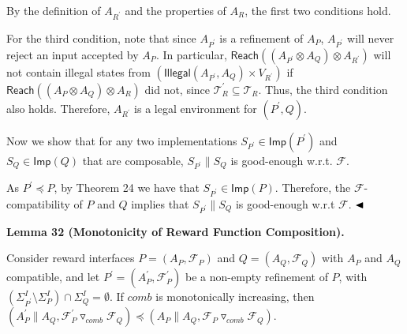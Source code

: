  
  
By the definition of $A_{R^{\prime}}$ and the properties of $A_{R}$, the first two conditions hold.\par
 
 
 
For the third condition, note that since $A_{P^{\prime}}$ is a refinement of $A_{P}$, $A_{P^{\prime}}$ will never reject an input accepted by $A_{P}$. In particular, $\mathsf{Reach}((A_{P^{\prime}}\otimes A_{Q})\otimes A_{R^{\prime}})$ will not contain illegal states from $(\mathsf{Illegal}(A_{P^{\prime}},A_{Q})\times V_{R^{\prime}})$ if $\mathsf{Reach}((A_{P}\otimes A_{Q})\otimes A_{R})$ did not, since $\mathcal{T}^{\prime}_{R}\subseteq\mathcal{T}_{R}$. Thus, the third condition also holds. Therefore, $A_{R^{\prime}}$ is a legal environment for $(P^{\prime},Q)$.\par
 
 
 
Now we show that for any two implementations $S_{P^{\prime}}\in\mathsf{Imp}(P^{\prime})$ and $S_{Q}\in\mathsf{Imp}(Q)$ that are composable, $S_{P^{\prime}}\parallel S_{Q}$ is good-enough w.r.t. $\mathcal{F}$.\par
 
 
 
As $P^{\prime}\preceq P$, by Theorem 24 we have that $S_{P^{\prime}}\in\mathsf{Imp}(P)$. Therefore, the $\mathcal{F}$-compatibility of $P$ and $Q$ implies that $S_{P^{\prime}}\parallel S_{Q}$ is good-enough w.r.t $\mathcal{F}$. $\hfill\blacktriangleleft$\par
 
 
 
\par\medskip\noindent\textbf{Lemma 32 (Monotonicity of Reward Function Composition).}\par
 
 
Consider reward interfaces $P=(A_{P},\mathcal{F}_{P})$ and $Q=(A_{Q},\mathcal{F}_{Q})$ with $A_{P}$ and $A_{Q}$ compatible, and let $P^{\prime}=(A_{P}^{\prime},\mathcal{F}_{P}^{\prime})$ be a non-empty refinement of $P$, with $(\Sigma_{P^{\prime}}^{I}\setminus\Sigma_{P}^{I})\cap\Sigma_{Q}^{I}=\emptyset$. If $\mathit{comb}$ is monotonically increasing, then $(A_{P}^{\prime}\parallel A_{Q},{{\mathcal{F}_{P}^{\prime}}\mathbin{\triangledown_{\mathit{comb}}}{\mathcal{F}_{Q}}})\preceq(A_{P}\parallel A_{Q},{{\mathcal{F}_{P}}\mathbin{\triangledown_{\mathit{comb}}}{\mathcal{F}_{Q}}})$.\par
 
